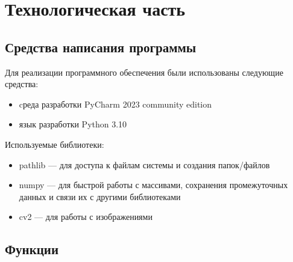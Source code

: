 \chapter{Технологическая часть}

\section{Средства написания программы}
Для реализации программного обеспечения были использованы следующие средства:

\begin{itemize}
    \item cреда разработки PyCharm 2023 community edition \cite{lib:pycharm}
    \item язык разработки Python 3.10 \cite{lib:python}
\end{itemize}
	
Используемые библиотеки:
\begin{itemize}
    \item pathlib — для доступа к файлам системы и создания папок/файлов \cite{lib:pathlib}
    \item numpy — для быстрой работы с массивами, сохранения промежуточных данных и связи их с другими библиотеками \cite{lib:numpy}
    \item cv2 — для работы с изображениями \cite{lib:opencv}
\end{itemize}

\section{Функции}

